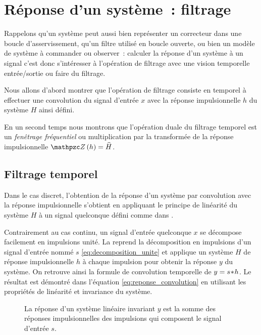 \section{Réponse d'un système~: filtrage}
Rappelons qu'un système peut aussi bien représenter un correcteur dans
une boucle d'asservissement, qu'un filtre utilisé en boucle ouverte,
ou bien un modèle de système à commander ou observer~: calculer la
réponse d'un système à un signal c'est donc s'intéresser à l'opération
de filtrage avec une vision temporelle entrée/sortie ou \og{}faire du
filtrage.\fg{}

Nous allons d'abord montrer que l'opération de filtrage consiste en
temporel à effectuer une convolution du signal d'entrée $x$ avec la
réponse impulsionnelle $h$ du système $H$ ainsi défini.

En un second temps nous montrons que l'opération duale du filtrage
temporel est un \emph{fenêtrage fréquentiel} ou multiplication par la
transformée de la réponse impulsionnelle $\TZ\p{h}=\TZlui{H}$.

\subsection{Filtrage temporel}
Dans le cas discret, l'obtention de la réponse d'un système par
convolution avec la réponse impulsionnelle s'obtient en appliquant le
principe de linéarité du système $H$ à un signal quelconque défini
comme dans .


Contrairement au cas continu, un signal d'entrée quelconque $x$ se
décompose facilement en impulsions unité. La
 reprend la décomposition en
impulsions d'un signal d'entrée nommé $s$
\eqref{eq:decomposition_unite} et applique un système $H$ de réponse
impulsionnelle $h$ à chaque impulsion pour obtenir la réponse $y$ du
système. On retrouve ainsi la formule de convolution temporelle de
$y=s\!\ast\! h$. Le résultat est démontré dans l'équation
\eqref{eq:reponse_convolution} en utilisant les propriétés de
linéarité et invariance du système.

\begin{figure}[ht!]
  \centering {}
  \caption{La réponse d'un système linéaire invariant $y$ est la somme
    des réponses impulsionnelles des impulsions qui composent le
    signal d'entrée $s$.}
  \label{fig:reponse_convolution}
\end{figure}

